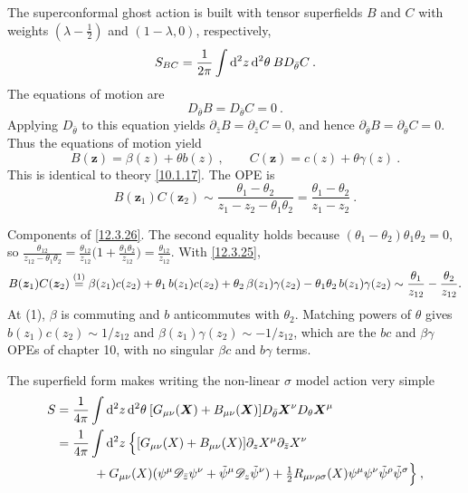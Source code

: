 The superconformal ghost action is built with tensor superfields $B$ and $C$ with weights $(\lambda-\frac{1}{2})$ and $(1-\lambda,0)$, respectively,
\begin{equation}
	S_{BC}=\frac{1}{2\pi}\int \mathrm{d}^{2}z\,\mathrm{d}^{2}\theta\: B D_{\bar{\theta}}C \:. \label{12.3.23}
\end{equation}
The equations of motion are
\begin{equation}
	D_{\bar{\theta}}B= D_{\bar{\theta}}C=0 \:. \label{12.3.24}
\end{equation}
Applying $D_{\bar{\theta}}$ to this equation yields $\partial_{\bar{z}}B=\partial_{\bar{z}}C=0$, and hence $\partial_{\bar{\theta}}B=\partial_{\bar{\theta}}C=0$. Thus the equations of motion yield
\begin{equation}
	B(\bm{z})=\beta(z)+\theta b(z) \:, \qquad C(\bm{z})=c(z)+\theta\gamma(z)\:. \label{12.3.25}
\end{equation}
This is identical to theory \eqref{10.1.17}. The OPE is
\begin{equation}
	B(\bm{z}_{1})C(\bm{z}_{2})\sim \frac{\theta_{1}-\theta_{2}}{z_{1}-z_{2}-\theta_{1}\theta_{2}}
	=\frac{\theta_{1}-\theta_{2}}{z_{1}-z_{2}} \:. \label{12.3.26}
\end{equation}
\begin{tcolorbox}[breakable]
	Components of \eqref{12.3.26}. The second equality holds because $(\theta_{1}-\theta_{2})\theta_{1}\theta_{2}=0$, so $\frac{\theta_{12}}{z_{12}-\theta_{1}\theta_{2}}=\frac{\theta_{12}}{z_{12}}\bigl(1+\frac{\theta_{1}\theta_{2}}{z_{12}}\bigr)=\frac{\theta_{12}}{z_{12}}$. With \eqref{12.3.25},
	\begin{align*}
		B(\bm z_{1})C(\bm z_{2})
		\overset{(1)}{=} \beta(z_{1})c(z_{2})+\theta_{1}\,b(z_{1})c(z_{2})+\theta_{2}\,\beta(z_{1})\gamma(z_{2})-\theta_{1}\theta_{2}\,b(z_{1})\gamma(z_{2})
		\sim\frac{\theta_{1}}{z_{12}}-\frac{\theta_{2}}{z_{12}} .
	\end{align*}
	At (1), $\beta$ is commuting and $b$ anticommutes with $\theta_{2}$. Matching powers of $\theta$ gives $b(z_{1})c(z_{2})\sim1/z_{12}$ and $\beta(z_{1})\gamma(z_{2})\sim-1/z_{12}$, which are the $bc$ and $\beta\gamma$ OPEs of chapter 10, with no singular $\beta c$ and $b\gamma$ terms.
\end{tcolorbox}
The superfield form makes writing the non-linear $\sigma$ model action very simple
\begin{align}
	S &= \frac{1}{4\pi}\int\mathrm{d}^{2}z\,\mathrm{d}^{2}\theta\:[G_{\mu\nu}(\bm{X})+B_{\mu\nu}(\bm{X})]
	D_{\bar{\theta}}\bm{X}^{\nu}D_{\theta}\bm{X}^{\mu} \nonumber \\ 
	&=\frac{1}{4\pi}\int \mathrm{d}^{2}z\:\Bigl\{[G_{\mu\nu}(X)+B_{\mu\nu}(X)]\partial_{z}X^{\mu}\partial_{\bar{z}}X^{\nu}
	\nonumber \\
	&\qquad \quad+G_{\mu\nu}(X)(\psi^{\mu}\mathscr{D}_{\bar{z}}\psi^{\nu}+\tilde{\psi}^{\mu}\mathscr{D}_{z}\tilde{\psi}^{\nu})+\tfrac{1}{2}R_{\mu\nu\rho\sigma}(X)\psi^{\mu}\psi^{\nu}\tilde{\psi}^{\rho}\tilde{\psi}^{\sigma}\Bigr\}\:,
	\label{12.3.27}
\end{align}
